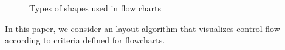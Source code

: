 \documentclass[conference]{IEEEtran}
\begin{document}
\begin{figure}[htb]
  \centering
  \begin{minipage}[b]{0.24\linewidth}
  \end{minipage}
  \hfill
  \begin{minipage}[b]{0.24\linewidth}
  \end{minipage}
  \begin{minipage}[b]{0.24\linewidth}
  \end{minipage}
  \begin{minipage}[b]{0.24\linewidth}
  \end{minipage}

  \caption{Types of shapes used in flow charts}
  \label{fig:blocks}
\end{figure}
In this paper, we consider an layout algorithm that visualizes control flow according to criteria defined for flowcharts.
\end{document}
